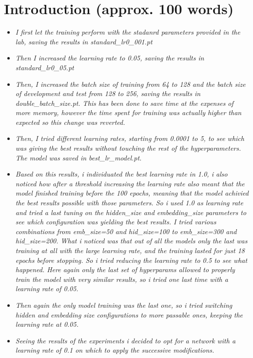 \documentclass[a4paper]{article}
\begin{document}
\section{Introduction (approx. 100 words)}
\begin{itemize}
    \item \textit{I first let the training perform with the stadanrd parameters provided in the lab, saving the results in standard_lr0_001.pt}
    \item \textit{Then I increased the learning rate to 0.05, saving the results in standard_lr0_05.pt}
    \item \textit{Then, I increased the batch size of training from 64 to 128 and the batch size of development and test from 128 to 256, saving the results in double_batch_size.pt. This has been done to save time at the expenses of more memory, however the time spent for training was actually higher than expected so this change was reverted.}
    \item \textit{Then, I tried different learning rates, starting from 0.0001 to 5, to see which was giving the best results without touching the rest of the hyperparameters. The model was saved in best_lr_model.pt.}
    \item \textit{Based on this results, i individuated the best learning rate in 1.0, i also noticed how after a threshold increasing the learning rate also meant that the model finished training before the 100 epochs, meaning that the model achivied the best results possible with those parameters. So i used 1.0 as learning rate and tried a last tuning on the hidden_size and embedding_size parameters to see which configuration was yielding the best results. I tried various combinations from emb_size=50 and hid_size=100 to emb_size=300 and hid_size=200. 
    What i noticed was that out of all the models only the last was training at all with the large learning rate, and the training lasted for just 18 epochs before stopping. So i tried reducing the learning rate to 0.5 to see what happened. Here again only the last set of hyperparams allowed to properly train the model with very similar results, so i tried one last time with a learning rate of 0.05.}
    \item \textit{Then again the only model training was the last one, so i tried switching hidden and embedding size configurations to more passable ones, keeping the learning rate at 0.05.}
    \item \textit{Seeing the results of the experiments i decided to opt for a network with a learning rate of 0.1 on which to apply the successive modifications.}
\end{itemize}
\end{document}
